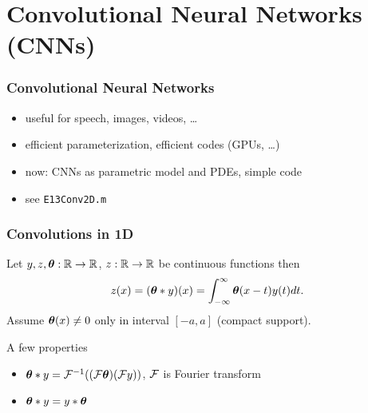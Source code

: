 \documentclass[12pt,fleqn,handout]{beamer}
\begin{document}
\section{Convolutional Neural Networks (CNNs)} %
\label{sec:convolutional_neural_networks}

\begin{frame}\frametitle{Convolutional Neural Networks~\cite{LeCun1990}}
	\begin{center}
	\end{center}
	\begin{itemize}
		\item useful for speech, images, videos, \ldots
		\item efficient parameterization, efficient codes (GPUs, \ldots)
		\item now: CNNs as parametric model and PDEs, simple code
		\item see \texttt{E13Conv2D.m}
	\end{itemize}

\end{frame}

\begin{frame}\frametitle{Convolutions in 1D}
	Let $y, z, {\boldsymbol \theta}:\mathbb{R} \to \mathbb{R}$, $z : \mathbb{R}\to\mathbb{R}$ be continuous functions then
	\begin{equation*}
		z(x) = ({\boldsymbol \theta} * y)(x) = \int_{-\infty}^\infty {\boldsymbol \theta}(x-t) y(t) dt.
	\end{equation*}
	Assume ${\boldsymbol \theta}(x) \neq 0$ only in interval $[-a,a]$ (compact support).
	
	\bigskip
	\pause
	
	A few properties
	\begin{itemize}
	\item $ {\boldsymbol \theta} * y = {\cal F}^{-1}(({\cal F} {\boldsymbol \theta}) ({\cal F} y))$, ${\cal F}$ is Fourier transform
	\item $ {\boldsymbol \theta} * y =  y * {\boldsymbol \theta}$ 
	\end{itemize}
	
	
\end{frame}	
\end{document}
